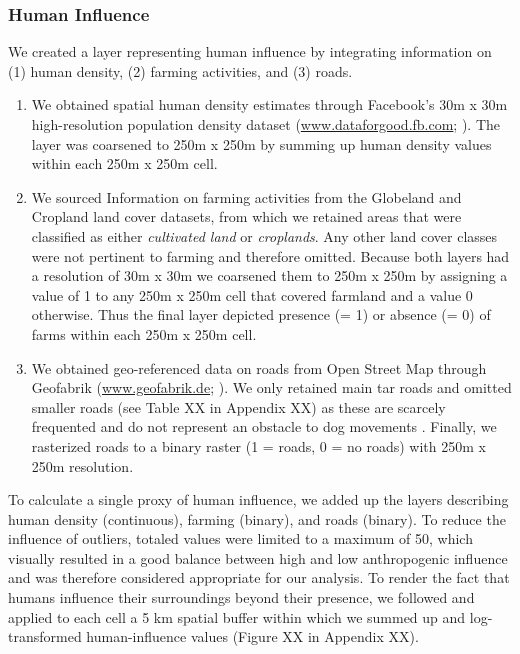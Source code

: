 \documentclass[abstract=on,10pt,a4paper,bibliography=totocnumbered]{article}
\begin{document}
\subsubsection{Human Influence}
We created a layer representing human influence by integrating information on
(1) human density, (2) farming activities, and (3) roads.

\begin{enumerate}[label = (\arabic*)]

  \item We obtained spatial human density estimates through Facebook's 30m x 30m
  high-resolution population density dataset (\url{www.dataforgood.fb.com};
  \citealp{Facebook.2019}). The layer was coarsened to 250m x 250m by summing up
  human density values within each 250m x 250m cell.

  \item We sourced Information on farming activities from the Globeland
  \citep{Chen.2015} and Cropland \citep{Xiong.2017} land cover datasets, from
  which we retained areas that were classified as either \textit{cultivated
  land} or \textit{croplands}. Any other land cover classes were not pertinent
  to farming and therefore omitted. Because both layers had a resolution of 30m
  x 30m we coarsened them to 250m x 250m by assigning a value of 1 to any 250m x
  250m cell that covered farmland and a value 0 otherwise. Thus the final layer
  depicted presence (= 1) or absence (= 0) of farms within each 250m x 250m
  cell.

  \item We obtained geo-referenced data on roads from Open Street Map through
  Geofabrik (\url{www.geofabrik.de}; \citealp{Geofabrik.2019}). We only retained
  main tar roads and omitted smaller roads (see Table XX in Appendix XX) as
  these are scarcely frequented and do not represent an obstacle to dog
  movements \citep{Abrahms.2016}. Finally, we rasterized roads to a binary
  raster (1 = roads, 0 = no roads) with 250m x 250m resolution.

\end{enumerate}

\noindent To calculate a single proxy of human influence, we added up the layers
describing human density (continuous), farming (binary), and roads (binary). To
reduce the influence of outliers, totaled values were limited to a maximum of
50, which visually resulted in a good balance between high and low anthropogenic
influence and was therefore considered appropriate for our analysis. To render
the fact that humans influence their surroundings beyond their presence, we
followed \cite{Elliot.2014} and applied to each cell a 5 km spatial buffer
within which we summed up and log-transformed human-influence values (Figure XX
in Appendix XX).
\end{document}

